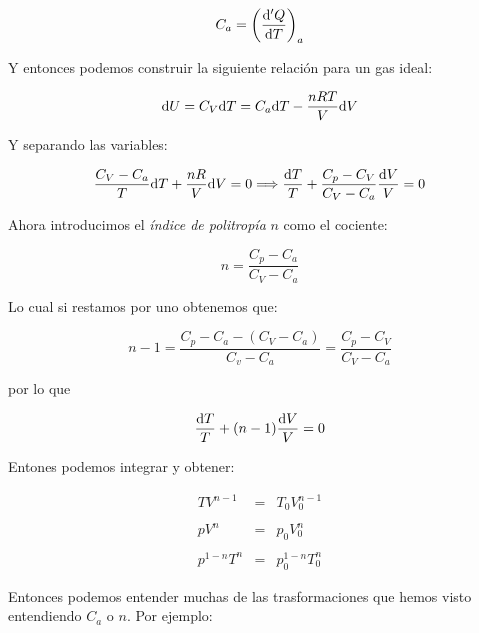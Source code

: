 \documentclass[12pt,a4paper]{article}
\begin{document}
\begin{equation}
C_a = \left( \dfrac{\mathrm{d} ' Q}{\mathrm{d} T} \right)_a
\end{equation}

Y entonces podemos construir la siguiente relación para un gas ideal:

\begin{equation}
\mathrm{d} U = C_V \mathrm{d} T = C_a \mathrm{d} T - \dfrac{nRT}{V} \mathrm{d} V 
\end{equation}

Y separando las variables:

\begin{equation}
\dfrac{C_V - C_a}{T} \mathrm{d} T + \dfrac{nR}{V} \mathrm{d} V  = 0 \Longrightarrow  \dfrac{\mathrm{d} T}{T} + \dfrac{C_p - C_V}{C_V - C_a} \dfrac{\mathrm{d} V}{V} = 0
\end{equation}

Ahora introducimos el \textit{índice de politropía} $n$ como el cociente:

\begin{equation}
n = \dfrac{C_p - C_a}{C_V - C_a} \label{ec:1.4-040}
\end{equation}

Lo cual si restamos por uno obtenemos que:

\begin{equation}
n - 1 = \dfrac{C_p - C_a - (C_V - C_a)}{C_v - C_a} = \dfrac{C_p - C_V}{C_V - C_a}
\end{equation}

por lo que

\begin{equation}
\dfrac{\mathrm{d} T}{T} + (n-1) \dfrac{\mathrm{d} V}{V} = 0
\end{equation}


Entones podemos integrar y obtener:

\begin{eqnarray}
T V^{n-1} & = & T_0 V_0^{n-1} \\ \nonumber\\
p V^{n} & = & p_0 V_0^n \\ \nonumber\\
p^{1-n}T^n & =  & p_0^{1-n}T_0^n
\end{eqnarray}

Entonces podemos entender muchas de las trasformaciones que hemos visto entendiendo $C_a$ o $n$. Por ejemplo:
\end{document}
